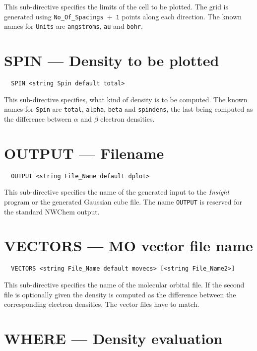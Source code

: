 This sub-directive specifies the limits of the cell to be plotted.
The grid is generated using \verb+No_Of_Spacings+~+~\verb+1+ points
along each direction. The known names for \verb+Units+ are
\verb+angstroms+, \verb+au+ and \verb+bohr+.



\section{SPIN --- Density to be plotted}

\begin{verbatim}
  SPIN <string Spin default total>
\end{verbatim}

This sub-directive specifies, what kind of density is to be computed. The 
known names for \verb+Spin+ are \verb+total+, \verb+alpha+, \verb+beta+
and \verb+spindens+, the last being computed as the difference between
$\alpha$ and $\beta$ electron densities.



\section{OUTPUT --- Filename}

\begin{verbatim}
  OUTPUT <string File_Name default dplot>
\end{verbatim}

This sub-directive specifies the name of the generated input to the
{\em Insight} program or the generated Gaussian cube file. 
The name \verb+OUTPUT+ is reserved for the
standard NWChem output.



\section{VECTORS --- MO vector file name}

\begin{verbatim}
  VECTORS <string File_Name default movecs> [<string File_Name2>]
\end{verbatim}

This sub-directive specifies the name of the molecular orbital file.
If the second file is optionally given the density is computed as the
difference between the corresponding electron densities. The vector 
files have to match.



\section{WHERE --- Density evaluation}


